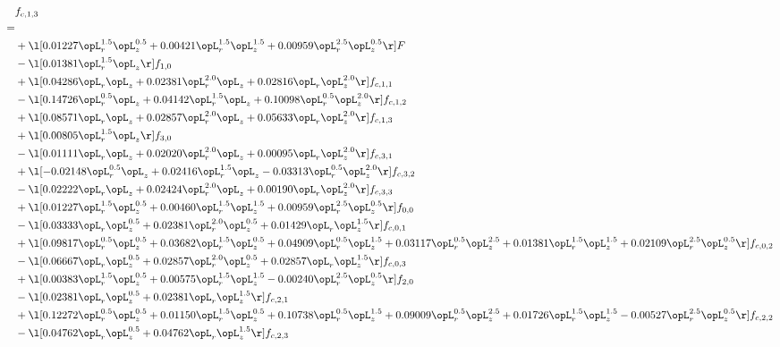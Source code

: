 \begin{alignat}{2} 
\label{eq:f_13_1} 
& f_{c,1,3} \nonumber \\ 
 = \\ 
& + \l[  0.01227 \opL_r^{1.5} \opL_z^{0.5} +  0.00421 \opL_r^{1.5} \opL_z^{1.5} +  0.00959 \opL_r^{2.5} \opL_z^{0.5}  \r] F \nonumber \\ 
& - \l[  0.01381 \opL_r^{1.5} \opL_z  \r] f_{1,0} \nonumber \\ 
& + \l[  0.04286 \opL_r \opL_z +  0.02381 \opL_r^{2.0} \opL_z +  0.02816 \opL_r \opL_z^{2.0}  \r] f_{c,1,1} \nonumber \\ 
& - \l[  0.14726 \opL_r^{0.5} \opL_z +  0.04142 \opL_r^{1.5} \opL_z +  0.10098 \opL_r^{0.5} \opL_z^{2.0}  \r] f_{c,1,2} \nonumber \\ 
& + \l[  0.08571 \opL_r \opL_z +  0.02857 \opL_r^{2.0} \opL_z +  0.05633 \opL_r \opL_z^{2.0}  \r] f_{c,1,3} \nonumber \\ 
& + \l[  0.00805 \opL_r^{1.5} \opL_z  \r] f_{3,0} \nonumber \\ 
& - \l[  0.01111 \opL_r \opL_z +  0.02020 \opL_r^{2.0} \opL_z +  0.00095 \opL_r \opL_z^{2.0}  \r] f_{c,3,1} \nonumber \\ 
& + \l[  -0.02148 \opL_r^{0.5} \opL_z +  0.02416 \opL_r^{1.5} \opL_z   -0.03313 \opL_r^{0.5} \opL_z^{2.0}  \r] f_{c,3,2} \nonumber \\ 
& - \l[  0.02222 \opL_r \opL_z +  0.02424 \opL_r^{2.0} \opL_z +  0.00190 \opL_r \opL_z^{2.0}  \r] f_{c,3,3} \nonumber \\ 
& + \l[  0.01227 \opL_r^{1.5} \opL_z^{0.5} +  0.00460 \opL_r^{1.5} \opL_z^{1.5} +  0.00959 \opL_r^{2.5} \opL_z^{0.5}  \r] f_{0,0} \nonumber \\ 
& - \l[  0.03333 \opL_r \opL_z^{0.5} +  0.02381 \opL_r^{2.0} \opL_z^{0.5} +  0.01429 \opL_r \opL_z^{1.5}  \r] f_{c,0,1} \nonumber \\ 
& + \l[  0.09817 \opL_r^{0.5} \opL_z^{0.5} +  0.03682 \opL_r^{1.5} \opL_z^{0.5} +  0.04909 \opL_r^{0.5} \opL_z^{1.5} +  0.03117 \opL_r^{0.5} \opL_z^{2.5} +  0.01381 \opL_r^{1.5} \opL_z^{1.5} +  0.02109 \opL_r^{2.5} \opL_z^{0.5}  \r] f_{c,0,2} \nonumber \\ 
& - \l[  0.06667 \opL_r \opL_z^{0.5} +  0.02857 \opL_r^{2.0} \opL_z^{0.5} +  0.02857 \opL_r \opL_z^{1.5}  \r] f_{c,0,3} \nonumber \\ 
& + \l[  0.00383 \opL_r^{1.5} \opL_z^{0.5} +  0.00575 \opL_r^{1.5} \opL_z^{1.5}   -0.00240 \opL_r^{2.5} \opL_z^{0.5}  \r] f_{2,0} \nonumber \\ 
& - \l[  0.02381 \opL_r \opL_z^{0.5} +  0.02381 \opL_r \opL_z^{1.5}  \r] f_{c,2,1} \nonumber \\ 
& + \l[  0.12272 \opL_r^{0.5} \opL_z^{0.5} +  0.01150 \opL_r^{1.5} \opL_z^{0.5} +  0.10738 \opL_r^{0.5} \opL_z^{1.5} +  0.09009 \opL_r^{0.5} \opL_z^{2.5} +  0.01726 \opL_r^{1.5} \opL_z^{1.5}   -0.00527 \opL_r^{2.5} \opL_z^{0.5}  \r] f_{c,2,2} \nonumber \\ 
& - \l[  0.04762 \opL_r \opL_z^{0.5} +  0.04762 \opL_r \opL_z^{1.5}  \r] f_{c,2,3} \nonumber \\ 
\end{alignat} 


